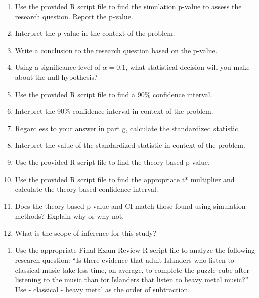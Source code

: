 \documentclass[
]{report}
\providecommand{\tightlist}{%
  \setlength{\itemsep}{0pt}\setlength{\parskip}{0pt}}
\begin{document}
\vspace{0.8in}

\begin{enumerate}
\def\labelenumi{\alph{enumi}.}
\setcounter{enumi}{7}
\item
  Use the provided R script file to find the simulation p-value to assess the research question. Report the p-value.
  \vspace{0.3in}
\item
  Interpret the p-value in the context of the problem.
  \vspace{0.8in}
\item
  Write a conclusion to the research question based on the p-value.
  \vspace{0.8in}
\item
  Using a significance level of \(\alpha = 0.1\), what statistical decision will you make about the null hypothesis?
  \vspace{0.3in}
\item
  Use the provided R script file to find a 90\% confidence interval.
  \vspace{0.3in}
\item
  Interpret the 90\% confidence interval in context of the problem.
  \vspace{0.8in}
\item
  Regardless to your answer in part g, calculate the standardized statistic.
  \vspace{0.4in}
\item
  Interpret the value of the standardized statistic in context of the problem.
  \vspace{0.8in}
\item
  Use the provided R script file to find the theory-based p-value.
  \vspace{0.3in}
\item
  Use the provided R script file to find the appropriate t* multiplier and calculate the theory-based confidence interval.
  \vspace{0.5in}
\item
  Does the theory-based p-value and CI match those found using simulation methods? Explain why or why not.
  \vspace{0.8in}
\item
  What is the scope of inference for this study?
  \vspace{0.8in}
\end{enumerate}

\newpage

\begin{enumerate}
\def\labelenumi{\arabic{enumi}.}
\setcounter{enumi}{2}
\tightlist
\item
  Use the appropriate Final Exam Review R script file to analyze the following research question: ``Is there evidence that adult Islanders who listen to classical music take less time, on average, to complete the puzzle cube after listening to the music than for Islanders that listen to heavy metal music?'' Use - classical - heavy metal as the order of subtraction.
\end{enumerate}
\end{document}
